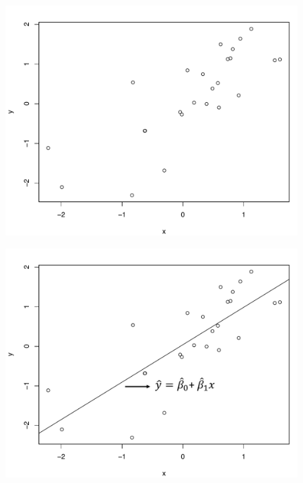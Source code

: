 \documentclass[10pt]{beamer}
\begin{document}
\begin{frame}
\begin{figure}
\includegraphics[scale=0.5]{figure/scatter1_2.pdf}
\end{figure}
\end{frame}

\begin{frame}
\begin{figure}
\includegraphics[scale=0.5]{figure/scatter2_2.pdf}
\end{figure}
\end{frame}
\end{document}
